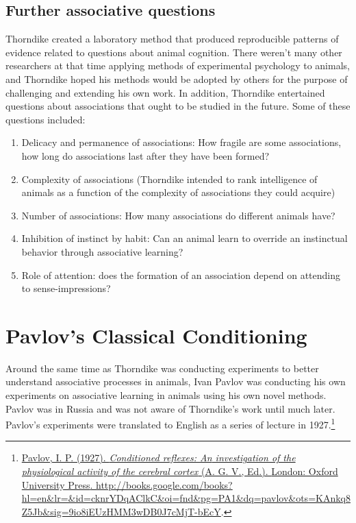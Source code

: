\documentclass[
  oneside,
  12pt]{crumpbook}
\providecommand{\tightlist}{%
  \setlength{\itemsep}{0pt}\setlength{\parskip}{0pt}}
\begin{document}
\hypertarget{further-associative-questions}{%
\subsection{Further associative questions}\label{further-associative-questions}}

Thorndike created a laboratory method that produced reproducible patterns of evidence related to questions about animal cognition. There weren't many other researchers at that time applying methods of experimental psychology to animals, and Thorndike hoped his methods would be adopted by others for the purpose of challenging and extending his own work. In addition, Thorndike entertained questions about associations that ought to be studied in the future. Some of these questions included:

\begin{enumerate}
\def\labelenumi{\arabic{enumi}.}
\tightlist
\item
  Delicacy and permanence of associations: How fragile are some associations, how long do associations last after they have been formed?
\item
  Complexity of associations (Thorndike intended to rank intelligence of animals as a function of the complexity of associations they could acquire)
\item
  Number of associations: How many associations do different animals have?
\item
  Inhibition of instinct by habit: Can an animal learn to override an instinctual behavior through associative learning?
\item
  Role of attention: does the formation of an association depend on attending to sense-impressions?
\end{enumerate}

\hypertarget{pavlovs-classical-conditioning}{%
\section{Pavlov's Classical Conditioning}\label{pavlovs-classical-conditioning}}

Around the same time as Thorndike was conducting experiments to better understand associative processes in animals, Ivan Pavlov was conducting his own experiments on associative learning in animals using his own novel methods. Pavlov was in Russia and was not aware of Thorndike's work until much later. Pavlov's experiments were translated to English as a series of lecture in 1927.\footnote{\protect\hyperlink{ref-pavlovConditionedReflexesInvestigation1927}{Pavlov, I. P. (1927). \emph{Conditioned reflexes: {An} investigation of the physiological activity of the cerebral cortex} (A. G. V., Ed.). {London: Oxford University Press}. \url{http://books.google.com/books?hl=en\&lr=\&id=cknrYDqAClkC\&oi=fnd\&pg=PA1\&dq=pavlov\&ots=KAnkq8Z5Jb\&sig=9io8iEUzHMM3wDB0J7cMjT-bEcY}}.}
\end{document}
